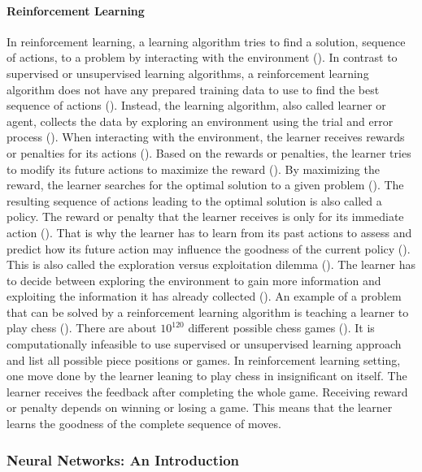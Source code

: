 \documentclass{BachelorBUI}
\begin{document}
            \paragraph{Reinforcement Learning}

                In reinforcement learning, a learning algorithm tries to find a solution, sequence of actions, to a problem by interacting with the environment (\cite{Alpaydin:2014}). In contrast to supervised or unsupervised learning algorithms, a reinforcement learning algorithm does not have any prepared training data to use to find the best sequence of actions (\cite{Mohri:2018}). Instead, the learning algorithm, also called learner or agent, collects the data by exploring an environment using the trial and error process (\cite{Bishop:2006}). When interacting with the environment, the learner receives rewards or penalties for its actions (\cite{Alpaydin:2014}). Based on the rewards or penalties, the learner tries to modify its future actions to maximize the reward (\cite{Mohri:2018}). By maximizing the reward, the learner searches for the optimal solution to a given problem (\cite{Bishop:2006}). The resulting sequence of actions leading to the optimal solution is also called a policy. The reward or penalty that the learner receives is only for its immediate action (\cite{Mohri:2018}). That is why the learner has to learn from its past actions to assess and predict how its future action may influence the goodness of the current policy (\cite{Alpaydin:2014}). This is also called the exploration versus exploitation dilemma (\cite{Alpaydin:2014}). The learner has to decide between exploring the environment to gain more information and exploiting the information it has already collected (\cite{Alpaydin:2014}). An example of a problem that can be solved by a reinforcement learning algorithm is teaching a learner to play chess (\cite{Alpaydin:2014}). There are about $10^{120}$ different possible chess games (\cite{Shannon:1988}). It is computationally infeasible to use supervised or unsupervised learning approach and list all possible piece positions or games. In reinforcement learning setting, one move done by the learner leaning to play chess in insignificant on itself. The learner receives the feedback after completing the whole game. Receiving reward or penalty depends on winning or losing a game. This means that the learner learns the goodness of the complete sequence of moves.

        \subsubsection{Neural Networks: An Introduction}
\end{document}
